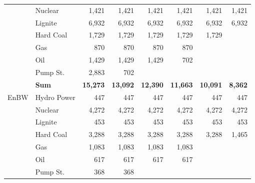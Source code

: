 \begin{table}[htb]
\begin{tabular}{llrrrrrr}
           &    Nuclear &       1,421 &       1,421 &       1,421 &       1,421 &       1,421 &       1,421 \\

           &    Lignite &       6,932 &       6,932 &       6,932 &       6,932 &       6,932 &       6,932 \\

           &  Hard Coal &       1,729 &       1,729 &       1,729 &       1,729 &       1,729 &            \\

           &        Gas &        870 &        870 &        870 &        870 &            &            \\

           &        Oil &       1,429 &       1,429 &       1,429 &        702 &            &            \\

           &   Pump St. &       2,883 &        702 &            &            &            &            \\

           &  {\bf Sum} & {\bf 15,273} & {\bf 13,092} & {\bf 12,390} & {\bf 11,663} & {\bf 10,091} & {\bf 8,362} \\
\hline
      EnBW & Hydro Power &        447 &        447 &        447 &        447 &        447 &        447 \\

           &    Nuclear &       4,272 &       4,272 &       4,272 &       4,272 &       4,272 &       4,272 \\

           &    Lignite &        453 &        453 &        453 &        453 &        453 &        453 \\

           &  Hard Coal &       3,288 &       3,288 &       3,288 &       3,288 &       3,288 &       1,465 \\

           &        Gas &       1,083 &       1,083 &       1,083 &       1,083 &            &            \\

           &        Oil &        617 &        617 &        617 &        617 &            &            \\

           &   Pump St. &        368 &        368 &            &            &            &            \\


\end{tabular}
\end{table}

